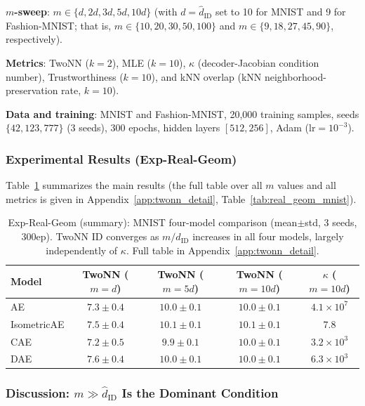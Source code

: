 \documentclass[make,article,submit,pdftex,moreauthors]{Definitions/mdpi}
\newcommand{\kap}{\kappa}
\begin{document}
\textbf{$m$-sweep}: $m \in \{d, 2d, 3d, 5d, 10d\}$
(with $d = \hat{d}_\mathrm{ID}$ set to 10 for MNIST and 9 for Fashion-MNIST;
that is, $m \in \{10, 20, 30, 50, 100\}$ and $m \in \{9, 18, 27, 45, 90\}$,
respectively).

\textbf{Metrics}: TwoNN ($k=2$), MLE ($k=10$), $\kap$ (decoder-Jacobian
condition number), Trustworthiness ($k=10$), and kNN overlap (kNN
neighborhood-preservation rate, $k=10$).

\textbf{Data and training}: MNIST and Fashion-MNIST, 20,000 training samples,
seeds $\{42, 123, 777\}$ (3 seeds), 300 epochs, hidden layers $[512, 256]$,
Adam (lr$=10^{-3}$).

\subsubsection*{Experimental Results (Exp-Real-Geom)}

Table~\ref{tab:real_geom_summary} summarizes the main results (the full table
over all $m$ values and all metrics is given in
Appendix~\ref{app:twonn_detail}, Table~\ref{tab:real_geom_mnist}).

\begin{table}[H]
\centering
\caption{Exp-Real-Geom (summary): MNIST four-model comparison (mean$\pm$std, 3 seeds, 300ep). TwoNN ID converges as $m/\hat{d}_\mathrm{ID}$ increases in all four models, largely independently of $\kap$. Full table in Appendix~\ref{app:twonn_detail}.}
\label{tab:real_geom_summary}
\small
\begin{tabular}{lcccc}
\toprule
Model & TwoNN ($m{=}d$) & TwoNN ($m{=}5d$) & TwoNN ($m{=}10d$) & $\kap$ ($m{=}10d$) \\
\midrule
AE          & $7.3\pm0.4$ & $10.0\pm0.1$ & $10.0\pm0.1$ & $4.1\times10^7$ \\
IsometricAE & $7.5\pm0.4$ & $10.1\pm0.1$ & $10.1\pm0.1$ & $7.8$ \\
CAE         & $7.2\pm0.5$ & $9.9\pm0.1$  & $10.0\pm0.1$ & $3.2\times10^3$ \\
DAE         & $7.6\pm0.4$ & $10.0\pm0.1$ & $10.0\pm0.1$ & $6.3\times10^3$ \\
\bottomrule
\end{tabular}
\end{table}

\subsubsection*{Discussion: $m \gg \hat{d}_\mathrm{ID}$ Is the Dominant Condition}
\end{document}
